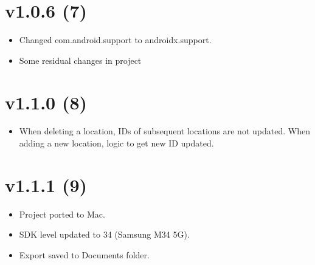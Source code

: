\documentclass{article}
\begin{document}
    \section{v1.0.6 (7)}\label{sec:7}
    \begin{itemize}
        \item Changed com.android.support to androidx.support.
        \item Some residual changes in project
    \end{itemize}


    \section{v1.1.0 (8)}\label{sec:8}
    \begin{itemize}
        \item When deleting a location, IDs of subsequent locations are not updated.
        When adding a new location, logic to get new ID updated.
    \end{itemize}

    \section{v1.1.1 (9)}\label{sec:9}
    \begin{itemize}
        \item Project ported to Mac.
        \item SDK level updated to 34 (Samsung M34 5G).
        \item Export saved to Documents folder.
    \end{itemize}
\end{document}
